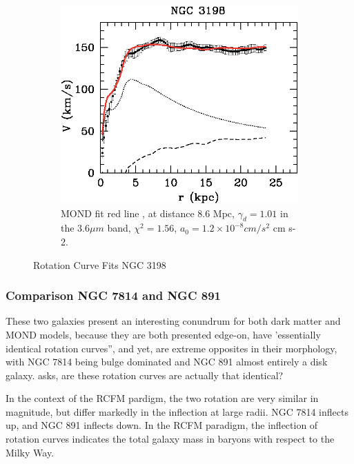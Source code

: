 \documentclass[reprint,%
 amsmath,amssymb,
 aps,
]{revtex4-1}
\begin{document}
\begin{figure}[h!]
\begin{subfigure}[c]{0.5\linewidth}
    \includegraphics[width=0.95\linewidth]{figures/NGC3198_TAM_aa15283-10-fig7.eps} 
    \caption{ MOND fit red line  , at distance $8.6$ Mpc,    $\gamma_d =  1.01$ in the $3.6 \mu m$ band, $\chi^2=1.56$, $a_0 = 1.2 \times 10^{-8} cm/ s^2$ cm s-2.\cite{Blok1} } 
    \label{fig:NGC3198MOND} 
  \end{subfigure}%
  \caption{ Rotation Curve Fits   NGC 3198 }
  \label{fig1super} 
\end{figure}


    \subsubsection{Comparison NGC 7814 and NGC 891}
  
 These two galaxies present an interesting conundrum for both dark matter and MOND models, because they are both presented edge-on, have 'essentially identical rotation curves'', and yet,  are extreme opposites in their morphology,  with NGC 7814 being bulge dominated and NGC 891 almost entirely a disk galaxy. 
 \citet{Frat1} asks, are these rotation curves are actually that identical?
 
 
 
 In the context of the RCFM  pardigm, the two rotation are  very similar in magnitude,  but   differ markedly in the inflection  at large radii. 
 NGC 7814 inflects up, and  NGC 891 inflects down.
 In the RCFM paradigm, the inflection of rotation curves indicates   the total galaxy mass in baryons with respect to   the Milky Way.  
 
\end{document}
